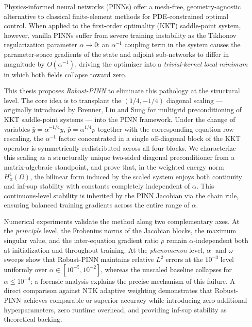 \documentclass{xmu}
\theoremstyle{plain}
\theoremstyle{remark}
\begin{document}
\begin{enabstract}
Physics-informed neural networks (PINNs) offer a mesh-free, geometry-agnostic alternative to classical finite-element methods for PDE-constrained optimal control. When applied to the first-order optimality (KKT) saddle-point system, however, vanilla PINNs suffer from severe training instability as the Tikhonov regularization parameter $\alpha\to 0$: an $\alpha^{-1}$ coupling term in the system causes the parameter-space gradients of the state and adjoint sub-networks to differ in magnitude by $O(\alpha^{-1})$, driving the optimizer into a \emph{trivial-kernel local minimum} in which both fields collapse toward zero.

This thesis proposes \emph{Robust-PINN} to eliminate this pathology at the structural level. The core idea is to transplant the $(1/4,-1/4)$ diagonal scaling — originally introduced by Brenner, Liu and Sung for multigrid preconditioning of KKT saddle-point systems — into the PINN framework. Under the change of variables $\bar y=\alpha^{-1/4}y$, $\bar p=\alpha^{1/4}p$ together with the corresponding equation-row rescaling, the $\alpha^{-1}$ factor concentrated in a single off-diagonal block of the KKT operator is symmetrically redistributed across all four blocks. We characterize this scaling as a structurally unique two-sided diagonal preconditioner from a matrix-algebraic standpoint, and prove that, in the weighted energy norm $H_\alpha^1(\Omega)$, the bilinear form induced by the scaled system enjoys both continuity and inf-sup stability with constants completely independent of $\alpha$. This continuous-level stability is inherited by the PINN Jacobian via the chain rule, ensuring balanced training gradients across the entire range of $\alpha$.

Numerical experiments validate the method along two complementary axes. At the \emph{principle} level, the Frobenius norms of the Jacobian blocks, the maximum singular value, and the inter-equation gradient ratio $\rho$ remain $\alpha$-independent both at initialization and throughout training. At the \emph{phenomenon} level, $\alpha$- and $\omega$-sweeps show that Robust-PINN maintains relative $L^2$ errors at the $10^{-3}$ level uniformly over $\alpha\in[10^{-5},10^{-2}]$, whereas the unscaled baseline collapses for $\alpha\le 10^{-4}$; a forensic analysis explains the precise mechanism of this failure. A direct comparison against NTK adaptive weighting demonstrates that Robust-PINN achieves comparable or superior accuracy while introducing zero additional hyperparameters, zero runtime overhead, and providing inf-sup stability as theoretical backing.
\end{enabstract}
\end{document}
